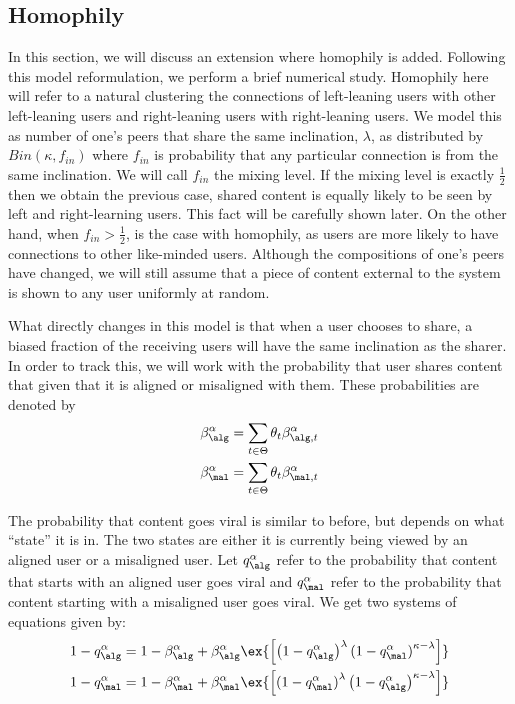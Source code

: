 \subsection{Homophily}\label{sec:homophil}
In this section, we will discuss an extension where homophily is added. Following this model reformulation, we perform a brief numerical study.  Homophily here will refer to a natural clustering the connections of left-leaning users with other left-leaning users and right-leaning users with right-leaning users. We model this as number of one's peers that share the same inclination, $\lambda$, as distributed by $Bin(\kappa, f_{in})$ where $f_{in}$ is probability that any particular connection is from the same inclination. We will call $f_{in}$ the mixing level. If the mixing level is exactly $\frac{1}{2}$ then we obtain the previous case, shared content is equally likely to be seen by left and right-learning users. This fact will be carefully shown later.  On the other hand, when $f_{in} > \frac{1}{2}$, is the case with homophily, as users are more likely to have connections to other like-minded users. Although the compositions of one's peers have changed, we will still assume that a piece of content external to the system is shown to any user uniformly at random. 

What directly changes in this model is that when a user chooses to share, a biased fraction of the receiving users will have the same inclination as the sharer. In order to track this, we will work with the probability that user shares content that given that it is aligned or misaligned with them.  These probabilities are denoted by
\begin{align}\label{eqn:new_share_prob}
\beta^\alpha_{\alg} &= \sum_{t \in \Theta} \theta_t \beta_{\alg, t}^\alpha  \\
\beta^\alpha_{\mal} &= \sum_{t \in \Theta} \theta_t  \beta_{\mal, t}^\alpha 
\end{align}

The probability that content goes viral is similar to before, but depends on what ``state'' it is in. The two states are either it is currently being viewed by an aligned user or a misaligned user. Let $q^\alpha_\alg$ refer to the probability that content that starts with an aligned user goes viral and $q^\alpha_\mal$ refer to the probability that content starting with a misaligned user goes viral. We get two systems of equations given by:
\begin{align}\label{eqn:new-fixed}
    1-q_\alg^\alpha = 1 -\beta^\alpha_\alg + \beta^\alpha_\alg \ex{\left[\left(1-q_\alg^\alpha\right)^{\lambda} \left(1-q^\alpha_\mal\right)^{\kappa - \lambda}\right]} \\ 
     1-q_\mal^\alpha = 1 -\beta^\alpha_\mal + \beta^\alpha_\mal \ex{\left[\left(1-q_\mal^\alpha\right)^{\lambda} \left(1-q^\alpha_\alg\right)^{\kappa - \lambda} \right]}
\end{align}

